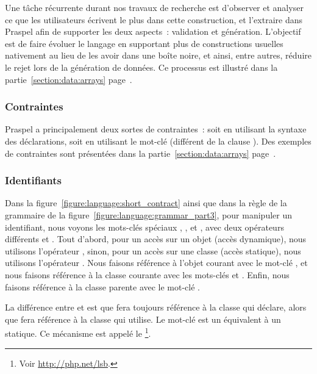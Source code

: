 Une tâche récurrente durant nos travaux de recherche est d'observer et analyser
ce que les utilisateurs écrivent le plus dans cette construction, et l'extraire
dans Praspel afin de supporter les deux aspects~: validation et génération.
L'objectif est de faire évoluer le langage en supportant plus de constructions
usuelles nativement au lieu de les avoir dans une boîte noire, et ainsi, entre
autres, réduire le rejet lors de la génération de données. Ce processus est
illustré dans la partie~\ref{section:data:arrays}
page~\pageref{section:data:arrays}.

\subsubsection{Contraintes}

Praspel a principalement deux sortes de contraintes~: soit en utilisant la
syntaxe des déclarations, soit en utilisant le mot-clé  (différent de
la clause \ais). Des exemples de contraintes sont présentées dans la
partie~\ref{section:data:arrays} page~\pageref{section:data:arrays}.

\subsubsection{Identifiants}

Dans la figure~\ref{figure:language:short_contract} ainsi que dans la règle
 de la grammaire de la
figure~\ref{figure:language:grammar_part3}, pour manipuler un identifiant, nous
voyons les mots-clés spéciaux , ,  et
, avec deux opérateurs différents \code{->} et \code{::}. Tout
d'abord, pour un accès sur un objet (accès dynamique), nous utilisons
l'opérateur \code{->}, sinon, pour un accès sur une classe (accès statique),
nous utilisons l'opérateur \code{::}. Nous faisons référence à l'objet courant
avec le mot-clé , et nous faisons référence à la classe courante avec
les mots-clés  et . Enfin, nous faisons référence à la
classe parente avec le mot-clé .

La différence entre  et  est que  fera
toujours référence à la classe qui déclare, alors que  fera
référence à la classe qui utilise. Le mot-clé  est un équivalent à
un  statique. Ce mécanisme est appelé le \footnote{Voir \url{http://php.net/lsb}.}.

